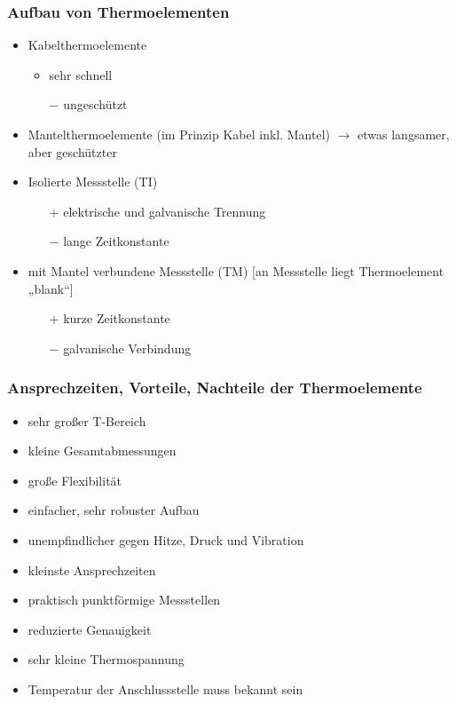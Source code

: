\subsubsection{Aufbau von Thermoelementen}
\begin{itemize}
\item Kabelthermoelemente
\begin{itemize}[label=$+$]
\item sehr schnell
\item[$-$] ungeschützt
\end{itemize}
\item Mantelthermoelemente (im Prinzip Kabel inkl. Mantel) $\to$ etwas langsamer, aber geschützter
\item Isolierte Messstelle (TI)
\begin{itemize}
\item[$+$] elektrische und galvanische Trennung
\item[$-$] lange Zeitkonstante
\end{itemize}
\item mit Mantel verbundene Messstelle (TM) [an Messstelle liegt Thermoelement „blank“]
\begin{itemize}
\item[$+$] kurze Zeitkonstante
\item[$-$] galvanische Verbindung
\end{itemize}
\end{itemize}
\subsubsection{Ansprechzeiten, Vorteile, Nachteile der Thermoelemente}
\begin{itemize}[label=$+$]
\item sehr großer T-Bereich
\item kleine Gesamtabmessungen
\item große Flexibilität
\item einfacher, sehr robuster Aufbau
\item unempfindlicher gegen Hitze, Druck und Vibration
\item kleinste Ansprechzeiten
\item praktisch punktförmige Messstellen
\end{itemize}
\begin{itemize}[label=$-$]
\item reduzierte Genauigkeit
\item sehr kleine Thermospannung
\item Temperatur der Anschlussstelle muss bekannt sein
\end{itemize}


